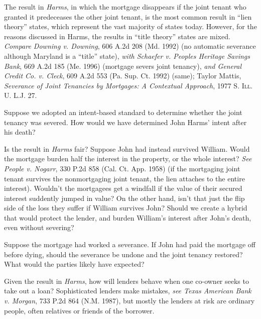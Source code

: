 
\item The result in \emph{Harms}, in which the mortgage disappears if the joint
tenant who granted it predeceases the other joint tenant, is the most common
result in ``lien theory'' states, which represent the vast majority of states
today. However, for the reasons discussed in Harms, the results in ``title
theory'' states are mixed. \emph{Compare Downing v. Downing}, 606 A.2d 208 (Md.
1992) (no automatic severance although Maryland is a ``title'' state),
\emph{with Schaefer v. Peoples Heritage Savings Bank}, 669 A.2d 185 (Me. 1996)
(mortgage severs joint tenancy), \emph{and General Credit Co. v. Cleck}, 609
A.2d 553 (Pa. Sup. Ct. 1992) (same); Taylor Mattis, \emph{Severance of Joint
Tenancies by Mortgages: A Contextual Approach}, 1977 \textsc{S. Ill. U. L.J.}
27.


Suppose we adopted an intent-based standard to determine whether the joint
tenancy was severed. How would we have determined John Harms' intent after his
death?



\item Is the result in \textit{Harms} fair? Suppose John had instead survived
William. Would the mortgage burden half the interest in the property, or the
whole interest? \textit{See} \emph{People v. Nogarr}, 330 P.2d 858 (Cal. Ct.
App. 1958) (if the mortgaging joint tenant survives the nonmortgaging joint
tenant, the lien attaches to the entire interest). Wouldn't the mortgagees get a
windfall if the value of their secured interest suddently jumped in value? On
the other hand, isn't that just the flip side of the loss they suffer if
William survives John? Should we create a hybrid that would protect the
lender, and burden William's interest after John's death, even without
severing?


Suppose the mortgage had worked a severance. If John had paid the mortgage off
before dying, should the severance be undone and the joint tenancy restored?
What would the parties likely have expected?



\item Given the result in \textit{Harms}, how will lenders behave when one
co-owner seeks to take out a loan? Sophisticated lenders make mistakes,
\emph{see Texas American Bank v. Morgan}, 733 P.2d 864 (N.M. 1987), but mostly
the lenders at risk are ordinary people, often relatives or friends of the
borrower.


